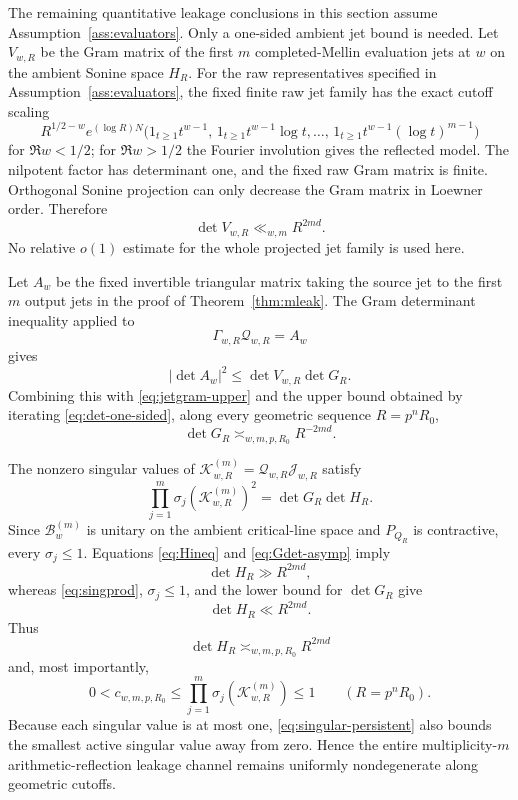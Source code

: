 \documentclass[11pt]{article}
\theoremstyle{remark}
\begin{document}
The remaining quantitative leakage conclusions in this section assume Assumption~\ref{ass:evaluators}. Only a one-sided ambient jet bound is needed.  Let $V_{w,R}$ be the Gram matrix of the first $m$ completed-Mellin evaluation jets at $w$ on the ambient Sonine space $H_R$.  For the raw representatives specified in Assumption~\ref{ass:evaluators}, the fixed finite raw jet family has the exact cutoff scaling
\[
 R^{1/2-w}e^{(\log R)N}
 \bigl(1_{t\ge1}t^{w-1},\,1_{t\ge1}t^{w-1}\log t,\ldots,\,
 1_{t\ge1}t^{w-1}(\log t)^{m-1}\bigr)
\]
for $\Re w<1/2$; for $\Re w>1/2$ the Fourier involution gives the reflected model.  The nilpotent factor has determinant one, and the fixed raw Gram matrix is finite.  Orthogonal Sonine projection can only decrease the Gram matrix in Loewner order.  Therefore
\begin{equation}\label{eq:jetgram-upper}
 \boxed{\det V_{w,R}\ll_{w,m}R^{2md}.}
\end{equation}
No relative $o(1)$ estimate for the whole projected jet family is used here.

Let $A_w$ be the fixed invertible triangular matrix taking the source jet to the first $m$ output jets in the proof of Theorem~\ref{thm:mleak}.  The Gram determinant inequality applied to
\[
 \Gamma_{w,R}\mathcal Q_{w,R}=A_w
\]
gives
\[
 |\det A_w|^2\le \det V_{w,R}\det G_R.
\]
Combining this with \eqref{eq:jetgram-upper} and the upper bound obtained by iterating \eqref{eq:det-one-sided}, along every geometric sequence $R=p^nR_0$,
\begin{equation}\label{eq:Gdet-asymp}
 \boxed{\det G_R\asymp_{w,m,p,R_0}R^{-2md}.}
\end{equation}

The nonzero singular values of $\mathcal K_{w,R}^{(m)}=\mathcal Q_{w,R}\mathcal J_{w,R}$ satisfy
\begin{equation}\label{eq:singprod}
 \prod_{j=1}^m\sigma_j(\mathcal K_{w,R}^{(m)})^2
 =\det G_R\det H_R.
\end{equation}
Since $\mathcal B_w^{(m)}$ is unitary on the ambient critical-line space and $P_{Q_R}$ is contractive, every $\sigma_j\le1$.  Equations \eqref{eq:Hineq} and \eqref{eq:Gdet-asymp} imply
\[
 \det H_R\gg R^{2md},
\]
whereas \eqref{eq:singprod}, $\sigma_j\le1$, and the lower bound for $\det G_R$ give
\[
 \det H_R\ll R^{2md}.
\]
Thus
\begin{equation}\label{eq:Hdet-asymp}
 \boxed{\det H_R\asymp_{w,m,p,R_0}R^{2md}}
\end{equation}
and, most importantly,
\begin{equation}\label{eq:singular-persistent}
 \boxed{
 0<c_{w,m,p,R_0}
 \le \prod_{j=1}^m\sigma_j(\mathcal K_{w,R}^{(m)})
 \le1
 }
 \qquad(R=p^nR_0).
\end{equation}
Because each singular value is at most one, \eqref{eq:singular-persistent} also bounds the smallest active singular value away from zero.  Hence the entire multiplicity-$m$ arithmetic-reflection leakage channel remains uniformly nondegenerate along geometric cutoffs.
\end{document}
